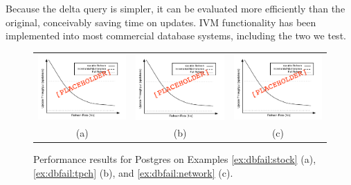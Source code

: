 Because the delta query is simpler, it can be evaluated more efficiently than the original, conceivably saving time on updates.  IVM functionality has been implemented into most commercial database systems, including the two we test.

\begin{figure}
\begin{center}
\begin{tabular}{ccc}
\includegraphics[width=2in]{../graphics-tmp/placeholder_db_result} &
\includegraphics[width=2in]{../graphics-tmp/placeholder_db_result} &
\includegraphics[width=2in]{../graphics-tmp/placeholder_db_result} \\
(a) & (b) & (c)
\end{tabular}
\end{center}
\label{fig:dbfail:postgres}
\caption{Performance results for Postgres on Examples \ref{ex:dbfail:stock} (a), \ref{ex:dbfail:tpch} (b), and \ref{ex:dbfail:network} (c).}
\end{figure}
